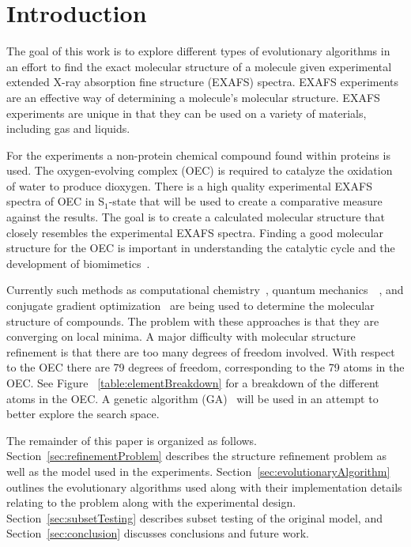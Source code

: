 \documentclass[conference]{IEEEtran}
\begin{document}
\section{Introduction}

The goal of this work is to explore different types of evolutionary algorithms in an effort to find the exact molecular structure of a molecule given experimental extended X-ray absorption fine structure (EXAFS) spectra. EXAFS experiments are an effective way of determining a molecule's molecular structure. EXAFS experiments are unique in that they can be used on a variety of materials, including gas and liquids. 

For the experiments a non-protein chemical compound found within proteins is used. The oxygen-evolving complex (OEC) is required to catalyze the oxidation of water to produce dioxygen. There is a high quality experimental EXAFS spectra of OEC in S$_1$-state that will be used to create a comparative measure against the results. The goal is to create a calculated molecular structure that closely resembles the experimental EXAFS spectra. Finding a good molecular structure for the OEC is important in understanding the catalytic cycle and the development of biomimetics~\cite{luber2011s1}.

Currently such methods as computational chemistry~\cite{hsiao2006exafs}, quantum mechanics~\cite{hsiao2006exafs}~\cite{sproviero2008model}, and conjugate gradient optimization~\cite{luber2011s1} are being used to determine the molecular structure of compounds. The problem with these approaches is that they are converging on local minima. A major difficulty with molecular structure refinement is that there are too many degrees of freedom involved. With respect to the OEC there are 79 degrees of freedom, corresponding to the 79 atoms in the OEC. See Figure ~\ref{table:elementBreakdown} for a breakdown of the different atoms in the OEC. A genetic algorithm (GA)~\cite{banzhaf1997genetic} will be used in an attempt to better explore the search space.

The remainder of this paper is  organized as follows. Section~\ref{sec:refinementProblem} describes the structure refinement problem as well as the model used in the experiments. Section~\ref{sec:evolutionaryAlgorithm} outlines the evolutionary algorithms used along with their implementation details relating to the problem along with the experimental design. Section~\ref{sec:subsetTesting} describes subset testing of the original model, and Section~\ref{sec:conclusion} discusses conclusions and future work.
\end{document}
